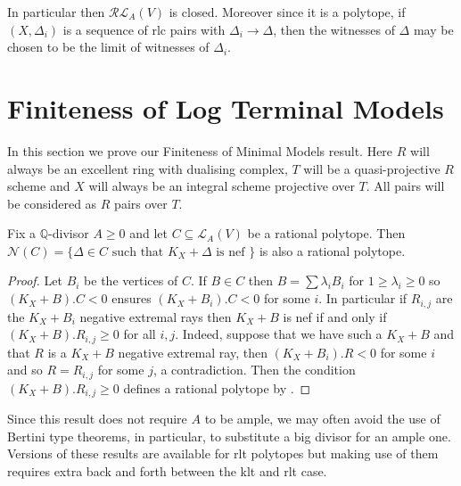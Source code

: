 	In particular then $\mathcal{RL}_{A}(V)$ is closed. Moreover since it is a polytope, if $(X,\Delta_{i})$ is a sequence of rlc pairs with $\Delta_{i} \to \Delta$, then the witnesses of $\Delta$ may be chosen to be the limit of witnesses of $\Delta_{i}$. 
	
	\section{Finiteness of Log Terminal Models}
	
	
	In this section we prove our Finiteness of Minimal Models result. Here $R$ will always be an excellent ring with dualising complex, $T$ will be a quasi-projective $R$ scheme and $X$ will always be an integral scheme projective over $T$. All pairs will be considered as $R$ pairs over $T$.
	
	\begin{lemma}\label{neftope}
		Fix a $\mathbb{Q}$-divisor $A \geq 0$ and let $C\subseteq \mathcal{L}_{A}(V)$ be a rational polytope. Then $\mathcal{N}(C)=\{\Delta \in C \text{ such that } K_{X}+\Delta \text{ is nef } \}$ is also a rational polytope.
	\end{lemma}

	\begin{proof}	
		Let $B_{i}$ be the vertices of $C$. If $B \in C$ then $B= \sum \lambda_{i} B_{i}$ for $1 \geq \lambda_{i} \geq 0$ so $(K_{X}+B).C <0$ ensures $(K_{X}+B_{i}).C <0$ for some $i$. In particular if $R_{i,j}$ are the $K_{X}+B_{i}$ negative extremal rays then $K_{X}+B$ is nef if and only if $(K_{X}+B).R_{i,j} \geq 0$ for all $i,j$. Indeed, suppose that we have such a $K_{X}+B$ and that $R$ is a $K_{X}+B$ negative extremal ray, then $(K_{X}+B_{i}).R <0$ for some $i$ and so $R=R_{i,j}$ for some $j$, a contradiction. Then the condition $(K_{X}+B).R_{i,j} \geq 0$ defines a rational polytope by \cite[Proposition 9.31]{bhatt2020}.
	\end{proof}
	
	Since this result does not require $A$ to be ample, we may often avoid the use of Bertini type theorems, \cite[Lemma 3.7.3]{BCHM10} in particular, to substitute a big divisor for an ample one. Versions of these results are available for rlt polytopes but making use of them requires extra back and forth between the klt and rlt case. 
	

